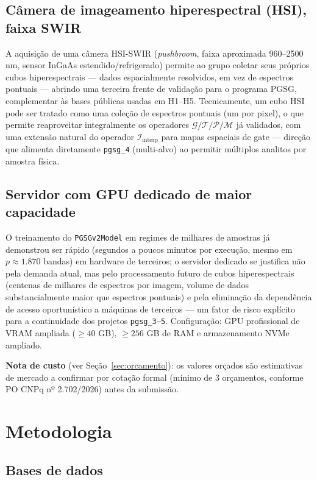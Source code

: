 \documentclass[11pt,a4paper]{article}
\begin{document}
\subsection{Câmera de imageamento hiperespectral (HSI), faixa SWIR}
A aquisição de uma câmera HSI-SWIR (\emph{pushbroom}, faixa aproximada 960--2500 nm, sensor InGaAs estendido/refrigerado) permite ao grupo coletar seus próprios cubos hiperespectrais --- dados espacialmente resolvidos, em vez de espectros pontuais --- abrindo uma terceira frente de validação para o programa PGSG, complementar às bases públicas usadas em H1--H5. Tecnicamente, um cubo HSI pode ser tratado como uma coleção de espectros pontuais (um por pixel), o que permite reaproveitar integralmente os operadores $\mathcal{G}/\mathcal{T}/\mathcal{P}/\mathcal{M}$ já validados, com uma extensão natural do operador $\mathcal{I}_{\text{interp}}$ para mapas espaciais de gate --- direção que alimenta diretamente \texttt{pgsg\_4} (multi-alvo) ao permitir múltiplos analitos por amostra física.

\subsection{Servidor com GPU dedicado de maior capacidade}
O treinamento do \texttt{PGSGv2Model} em regimes de milhares de amostras já demonstrou ser rápido (segundos a poucos minutos por execução, mesmo em $p\approx 1.870$ bandas) em hardware de terceiros; o servidor dedicado se justifica não pela demanda atual, mas pelo processamento futuro de cubos hiperespectrais (centenas de milhares de espectros por imagem, volume de dados substancialmente maior que espectros pontuais) e pela eliminação da dependência de acesso oportunístico a máquinas de terceiros --- um fator de risco explícito para a continuidade dos projetos \texttt{pgsg\_3--5}. Configuração: GPU profissional de VRAM ampliada ($\geq 40$ GB), $\geq 256$ GB de RAM e armazenamento NVMe ampliado.

\noindent\textbf{Nota de custo} (ver Seção~\ref{sec:orcamento}): os valores orçados são estimativas de mercado a confirmar por cotação formal (mínimo de 3 orçamentos, conforme PO CNPq nº 2.702/2026) antes da submissão.

\section{Metodologia}
\label{sec:metodologia}

\subsection{Bases de dados}
\end{document}
